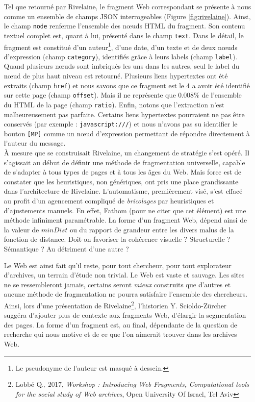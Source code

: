 \documentclass[symmetric,justified,marginals=raggedouter]{tufte-book}
\begin{document}
\noindent Tel que retourné par Rivelaine, le fragment Web correspondant se présente à nous comme un ensemble de champs JSON interrogeables (Figure \ref{fig:rivelaine}). Ainsi, le champ \texttt{node} renferme l'ensemble des nœuds HTML du fragment. Son contenu textuel complet est, quant à lui, présenté dans le champ \texttt{text}. Dans le détail, le fragment est constitué d'un auteur\footnote{\RaggedOuter Le pseudonyme de l'auteur est masqué à dessein.}, d'une date, d'un texte et de deux nœuds d'expression (champ \texttt{category}), identifiés grâce à leurs labels (champ \texttt{label}). Quand plusieurs nœuds sont imbriqués les uns dans les autres, seul le label du nœud de plus haut niveau est retourné. Plusieurs liens hypertextes ont été extraits (champ \texttt{href}) et nous savons que ce fragment est le 4\ieme{} a avoir été identifié sur cette page (champ \texttt{offset}). Mais il ne représente que $0.008\%$ de l'ensemble du HTML de la page (champ \texttt{ratio}).  Enfin, notons que l'extraction n'est malheureusement pas parfaite. Certains liens hypertextes pourraient ne pas être conservés (par exemple : \texttt{javascript:///}) et nous n'avons pas su identifier le bouton \texttt{[MP]} comme un nœud d'expression permettant de répondre directement à l'auteur du message.\\

\noindent À mesure que se construisait Rivelaine, un changement de stratégie s'est opéré. Il s'agissait au début de définir une méthode de fragmentation universelle, capable de s'adapter à tous types de pages et à tous les âges du Web. Mais force est de constater que les heuristiques, non génériques, ont pris une place grandissante dans l'architecture de Rivelaine. L'automatisme, premièrement visé, s'est effacé au profit d'un agencement compliqué de \textit{bricolages} par heuristiques et d'ajustements manuels. En effet, Fathom (pour ne citer que cet élément) est une méthode infiniment paramétrable. La forme d'un fragment Web, dé\-pend ainsi de la valeur de $minDist$ ou du rapport de grandeur entre les divers malus de la fonction de distance. Doit-on favoriser la cohérence visuelle ? Structurelle ? Sémantique ? Au détriment d'une autre ? 

Le Web est ainsi fait qu'il reste, pour tout chercheur, pour tout explorateur d'archives, un terrain d'étude non trivial. Le Web est vaste et sauvage. Les sites ne se ressembleront jamais, certains seront \textit{mieux} construits que d'autres et aucune méthode de fragmentation ne pourra satisfaire l'ensemble des chercheurs. Ainsi, lors d'une présentation de Rivelaine\footnote{\RaggedOuter Lobbé Q., 2017, \textit{Workshop : Introducing Web Fragments, Computational tools for the social study of Web archives}, Open University Of Israel, Tel Aviv}, l'historien Y. Scioldo-Zürcher suggéra d'ajouter plus de contexte aux fragments Web, d'élargir la segmentation des pages. La forme d'un fragment est, au final, dépendante de la question de recherche qui nous motive et de ce que l'on aimerait trouver dans les archives Web.
\end{document}
